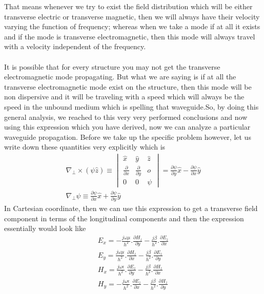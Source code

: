 That means whenever we try to exist the field distribution which will be either transverse electric or transverse magnetic, then we will always have their velocity varying the function of frequency; whereas when we take a mode if at all it exists and if the mode is transverse electromagnetic, then this mode will always travel with a velocity independent of the frequency.\\
\\
It is possible that for every structure you may not get the transverse electromagnetic mode propagating. But what we are saying is if at all the transverse electromagnetic mode exist on the structure, then this mode will be non dispersive and it will be traveling with a speed which will always be the speed in the unbound medium which is spelling that waveguide.So, by doing this general analysis, we reached to this very very performed conclusions and now using this expression which you have derived, now we can analyze a particular waveguide propagation. Before we take up the specific problem however, let us write down these quantities very explicitly which is
\begin{align*}
\nabla_\bot\times(\psi\hat{z}) \equiv 
\begin{vmatrix}
\hat{x} & \hat{y} &\hat{z}\\
\frac{\partial}{\partial x} & \frac{\partial}{\partial y} & o\\
0 & 0 & \psi
\end{vmatrix} = \frac{\partial\psi}{\partial y}\hat{x} - \frac{\partial\psi}{\partial x}\hat{y}\\
\nabla_\bot\psi \equiv \frac{\partial\psi}{\partial x}\hat{x} + \frac{\partial\psi}{\partial y}\hat{y}
\end{align*}
In Cartesian coordinate, then we can use this expression to get a transverse field component in terms of the longitudinal components and then the expression essentially would look like
\begin{align*}
E_x = -\frac{j\omega\mu}{h^2}.\frac{\partial H_z}{\partial y} - \frac{j\beta}{h^2}.\frac{\partial E_z}{\partial x}\\
E_y = \frac{j\omega\mu}{h^2}.\frac{\partial H_z}{\partial x} - \frac{j\beta}{h^2}.\frac{\partial E_z}{\partial y}\\
H_x = \frac{j\omega\epsilon}{h^2}.\frac{\partial E_z}{\partial y} - \frac{j\beta}{h^2}.\frac{\partial H_z}{\partial x}\\
H_y = -\frac{j\omega\epsilon}{h^2}.\frac{\partial E_z}{\partial x} - \frac{j\beta}{h^2}.\frac{\partial H_z}{\partial y}
\end{align*}
